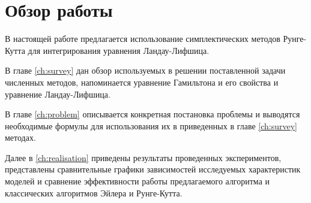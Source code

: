 \section{Обзор работы}

В настоящей работе предлагается использование симплектических методов
Рунге-Кутта для интегрирования уравнения Ландау-Лифшица.

В главе \ref{ch:survey} дан обзор используемых в решении
поставленной задачи численных методов, напоминается уравнение Гамильтона и его
свойства и уравнение Ландау-Лифшица.

В главе \ref{ch:problem} описывается конкретная постановка проблемы и выводятся
необходимые формулы для использования их в приведенных в главе \ref{ch:survey}
методах.

Далее в \ref{ch:realisation} приведены результаты проведенных экспериментов,
представлены сравнительные графики зависимостей исследуемых характеристик
моделей и сравнение эффективности работы предлагаемого алгоритма и классических
алгоритмов Эйлера и Рунге-Кутта.
